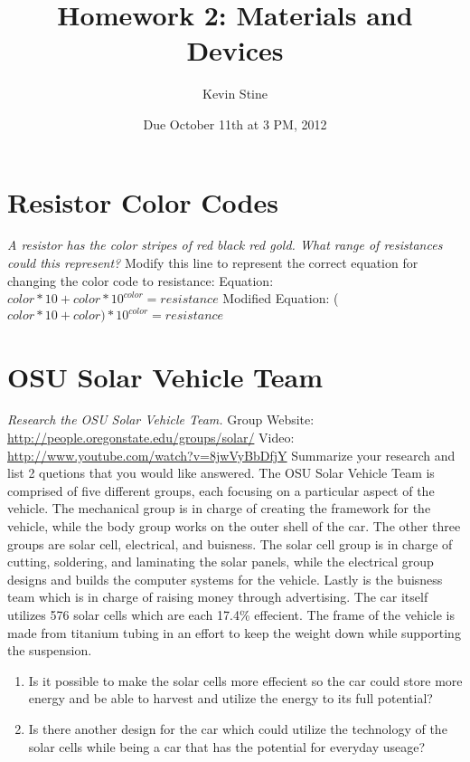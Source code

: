 \documentclass{article}
\title{Homework 2: Materials and Devices}
\author{Kevin Stine}
\date{Due October 11th at 3 PM, 2012}
\begin{document}
\maketitle

\section{Resistor Color Codes}
\emph{A resistor has the color stripes of red black red gold. What range of resistances could this represent?}
\newline
Modify this line to represent the correct equation for changing the color code to resistance:\newline
Equation:  $color*10+color*10^{color} = resistance$\newline
Modified Equation:  ($color*10+color)*10^{color} = resistance$

\section{OSU Solar Vehicle Team}
\emph{Research the OSU Solar Vehicle Team.}  \newline
Group Website:  \url{http://people.oregonstate.edu/groups/solar/}  \newline
Video:  \url{http://www.youtube.com/watch?v=8jwVyBbDfjY}\newline
Summarize your research and list 2 quetions that you would like answered.\newline
\newline
The OSU Solar Vehicle Team is comprised of five different groups, each focusing on a particular aspect of the vehicle. The mechanical group is in charge of creating the framework for the vehicle, while the body group works on the outer shell of the car. The other three groups are solar cell, electrical, and buisness. The solar cell group is in charge of cutting, soldering, and laminating the solar panels, while the electrical group designs and builds the computer systems for the vehicle. Lastly is the buisness team which is in charge of raising money through advertising. The car itself utilizes 576 solar cells which are each 17.4\% effecient. The frame of the vehicle is made from titanium tubing in an effort to keep the weight down while supporting the suspension.     
\newline
\newline
\begin{enumerate}
\item  Is it possible to make the solar cells more effecient so the car could store more energy and be able to harvest and utilize the energy to its full potential?
\item  Is there another design for the car which could utilize the technology of the solar cells while being a car that has the potential for everyday useage? 
\end{enumerate}

\end{document}
